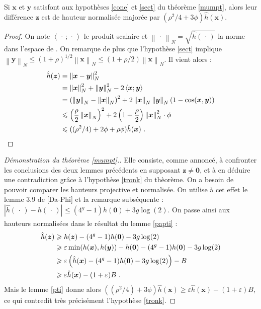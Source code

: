 \documentclass[11pt, twoside, a4paper, french]{article}
\numberwithin{equation}{section}
\renewcommand{\ge}{\geqslant} \renewcommand{\le}{\leqslant}
\newcommand{\eps}{\varepsilon} \newcommand{\truc}{\,\cdot\,}
\newcommand{\av}[2][v]{\left\lvert#2\right\rvert_{#1}} 		%
\newcommand{\nv}[2][v]{\left\lVert#2\right\rVert_{#1}} 		%
\newcommand{\p}[1]{{\boldsymbol{#1}}} 				%
\newcommand{\OA}{\p{0}} 					%
\newcommand{\hn}{\hat{h}} 					%
\begin{document}
\begin{lem} \label{pti}
Si $\p{x}$ et $\p{y}$ satisfont aux hypothèses \ref{cone} et \ref{sect} du théorème \ref{mumpt}, alors leur différence $\p{z}$ est de hauteur normalisée majorée par $(\rho^2/4 + 3\phi) \hn(\p{x})$.
\end{lem}

\begin{proof}
On note $\left<\truc; \truc \right>$ le produit scalaire et $\nv[N]{\truc} = \sqrt{\hn(\truc)}$ la norme dans l'espace de . On remarque de plus que l'hypothèse \ref{sect} implique $\nv[N]{\p{y}} \le (1+\rho)^{1/2}\nv[N]{\p{x}} \le (1+\rho/2) \nv[N]{\p{x}}$. Il vient alors :
\begin{align*}
\hn(\p{z}) & = \nv[N]{\p{x}-\p{y}}^2 \\ & = \nv[N]{\p{x}}^2 + \nv[N]{\p{y}}^2 - 2\left< \p{x}; \p{y} \right> \\
& = \left(\nv[N]{\p{y}} - \nv[N]{\p{x}}\right)^2 + 2\nv[N]{\p{x}}\nv[N]{\p{y}}\left( 1- \cos(\p{x}, \p{y}) \right) \\
& \le \left( \frac{\rho}{2}\nv[N]{\p{x}} \right)^2 + 2\left( 1+\frac{\rho}{2} \right) \nv[N]{\p{x}}^2 \cdot \phi \\
& \le ((\rho^2/4) + 2\phi + \rho\phi) \hn(\p{x})\pmm{.}\qedhere
\end{align*}
\end{proof}


\begin{proof}[Démonstration du théorème \ref{mumpt}.]
Elle consiste, comme annoncé, à confronter les conclusions des deux lemmes précédents en supposant $\p{z} \neq \OA$, et à en déduire une contradiction grâce à l'hypothèse \ref{tronk} du thèorème. On a besoin de pouvoir comparer les hauteurs projective et normalisée. On utilise à cet effet le lemme 3.9 de [Da-Phi] et la remarque subséquente : $\av[]{\hn(\truc) - h(\truc)} \le (4^g-1)h(\OA) + 3g\log(2)$. On passe ainsi aux hauteurs normalisées dans le résultat du lemme \ref{papti} :
\begin{align*}
\hn(\p{z}) & \ge h(\p{z}) - (4^g-1)h(\OA) - 3g\log(2)\\
& \ge \eps \min(h(\p{x}), h(\p{y})) - h(\OA) - (4^g-1)h(\OA) - 3g\log(2) \\
& \ge \eps \left(\hn(\p{x}) - (4^g-1)h(\OA) - 3g\log(2)\right) - B \\
& \ge \eps \hn(\p{x}) - (1+\eps)B \pmm{.}
\end{align*}
Mais le lemme \ref{pti} donne alors $((\rho^2/4) + 3\phi) \hn(\p{x}) \ge \eps \hn(\p{x}) - (1+\eps)B$, ce qui contredit très précisément l'hypothèse \ref{tronk}.
\end{proof}
\end{document}
